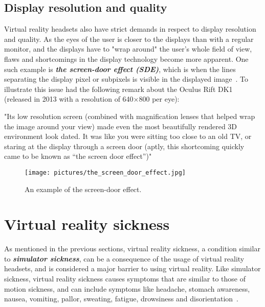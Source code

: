 \subsection{Display resolution and quality}
Virtual reality headsets also have strict demands in respect to display resolution and quality. As the eyes of the user is closer
to the displays than with a regular monitor, and the displays have to "wrap around" the user's whole field of view, flaws and shortcomings in the display technology 
become more apparent. 
One such example is \textbf{\textit{the screen-door effect (SDE)}}, 
which is when the lines separating the display pixel or subpixels is visible in the displayed image~\citep{TC2016}. 
To illustrate this issue \citet{TC2016} had the following remark about the Oculus Rift DK1 (released in 2013 with a resolution of 640×800 per eye):

"Its low resolution screen (combined with magnification lenses that helped wrap the image around your view) made even the most beautifully rendered 3D environment look dated. 
It was like you were sitting too close to an old TV, or staring at the display through a screen door (aptly, this shortcoming quickly came to be known as “the screen door effect”)"

\begin{figure}%
	\texttt{[image: pictures/the\_screen\_door\_effect.jpg]}
	\caption[The screen-door effect]{An example of the screen-door effect.}
	\label{fig:the_screen_door_effect}
\end{figure} 




\section{Virtual reality sickness}
As mentioned in the previous sections, virtual reality sickness, a condition similar to \textbf{\textit{simulator sickness}}, 
can be a consequence of the usage of virtual reality headsets, and is considered a major barrier to 
using virtual reality. Like simulator sickness, virtual reality sickness causes symptoms that are similar to those of motion sickness, and can include symptoms like 
headache, stomach awareness, nausea, vomiting, pallor, sweating, fatigue, drowsiness and disorientation~\citep{Kolasinski1995}. 

